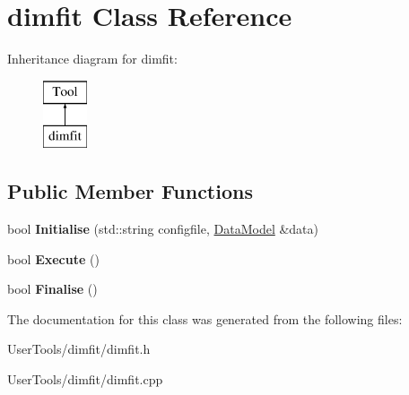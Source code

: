 \hypertarget{classdimfit}{\section{dimfit Class Reference}
\label{classdimfit}
}
Inheritance diagram for dimfit\-:\begin{figure}[H]
\begin{center}
\leavevmode
\includegraphics[height=2.000000cm]{classdimfit}
\end{center}
\end{figure}
\subsection*{Public Member Functions}
\begin{DoxyCompactItemize}
\item 
\hypertarget{classdimfit_a14db908c179f25acba98211d944dd3bd}{bool {\bfseries Initialise} (std\-::string configfile, \hyperlink{classDataModel}{Data\-Model} \&data)}\label{classdimfit_a14db908c179f25acba98211d944dd3bd}

\item 
\hypertarget{classdimfit_a214d0ff3e5268a3eccf7674d54f17bf6}{bool {\bfseries Execute} ()}\label{classdimfit_a214d0ff3e5268a3eccf7674d54f17bf6}

\item 
\hypertarget{classdimfit_a7f40e808c0af6512a53057748dc31c32}{bool {\bfseries Finalise} ()}\label{classdimfit_a7f40e808c0af6512a53057748dc31c32}

\end{DoxyCompactItemize}


The documentation for this class was generated from the following files\-:\begin{DoxyCompactItemize}
\item 
User\-Tools/dimfit/dimfit.\-h\item 
User\-Tools/dimfit/dimfit.\-cpp\end{DoxyCompactItemize}
